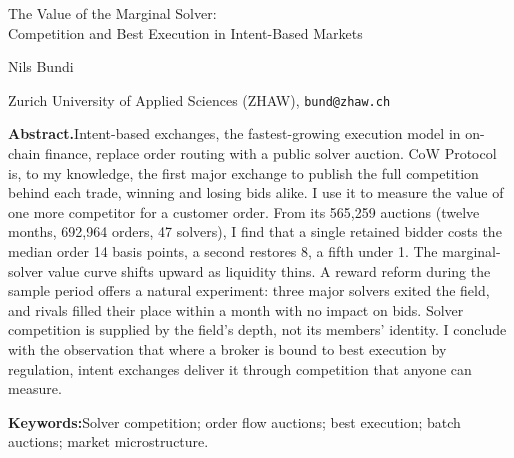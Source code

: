 \documentclass[11pt]{article}
\begin{document}
\begin{center}
{\fontsize{17}{20}\selectfont The Value of the Marginal Solver:\\[2pt]
Competition and Best Execution in Intent-Based Markets\par}
\vspace{0.8em}
{\fontsize{11}{14}\selectfont Nils Bundi\par}
{\fontsize{9}{11}\selectfont Zurich University of Applied Sciences (ZHAW), \texttt{bund@zhaw.ch}\par}
\end{center}
\vspace{1.2em}
\noindent\textbf{Abstract.}\quad Intent-based exchanges, the fastest-growing execution model in on-chain finance, replace order routing with a public solver auction. CoW Protocol is, to my knowledge, the first major exchange to publish the full competition behind each trade, winning and losing bids alike. I use it to measure the value of one more competitor for a customer order. From its 565{,}259 auctions (twelve months, 692{,}964 orders, 47 solvers), I find that a single retained bidder costs the median order 14 basis points, a second restores 8, a fifth under 1. The marginal-solver value curve shifts upward as liquidity thins. A reward reform during the sample period offers a natural experiment: three major solvers exited the field, and rivals filled their place within a month with no impact on bids. Solver competition is supplied by the field's depth, not its members' identity. I conclude with the observation that where a broker is bound to best execution by regulation, intent exchanges deliver it through competition that anyone can measure.

\vspace{1.4em}
\noindent\textbf{Keywords:}\quad Solver competition; order flow auctions; best execution; batch auctions; market microstructure.
\end{document}
